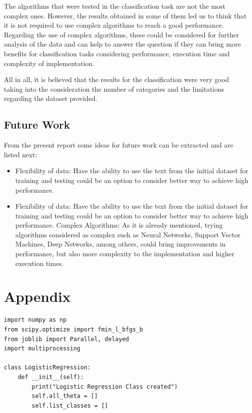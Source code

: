 \documentclass[letterpaper,10pt]{article}
\theoremstyle{mytheor}
\begin{document}
The algorithms that were tested in the classification task are not the most complex ones. However, the results obtained in some of them led us to think that it is not required to use complex algorithms to reach a good performance. Regarding the use of complex algorithms, these could be considered for further analysis of the data and can help to answer the question if they can bring more benefits for classification tasks considering performance, execution time and complexity of implementation.      
 
All in all, it is believed that the results for the classification were very good taking into the consideration the number of categories and the limitations regarding the dataset provided. 
\newpage

\subsection{Future Work}

From the present report some ideas for future work can be extracted and are listed next:
\begin{itemize}
\item Flexibility of data: Have the ability to use the text from the initial dataset for training and testing could be an option to consider better way to achieve high performance.

\item Flexibility of data: Have the ability to use the text from the initial dataset for training and testing could be an option to consider better way to achieve high performance.
Complex Algorithms: As it is already mentioned, trying algorithms considered as complex such as Neural Networks, Support Vector Machines, Deep Networks, among others, could bring improvements in performance, but also more complexity to the implementation and higher execution times. 
\end{itemize}


\nocite{wiki:fscore}
\nocite{wiki:pandr}
\nocite{wiki:stat} 
\nocite{wiki:curse}



\section{Appendix}
\begin{lstlisting}[label={list:first},caption=Class Definition]
import numpy as np
from scipy.optimize import fmin_l_bfgs_b
from joblib import Parallel, delayed
import multiprocessing

class LogisticRegression:
    def __init__(self):
        print("Logistic Regression Class created")
        self.all_theta = []
        self.list_classes = []
\end{lstlisting}
\end{document}
